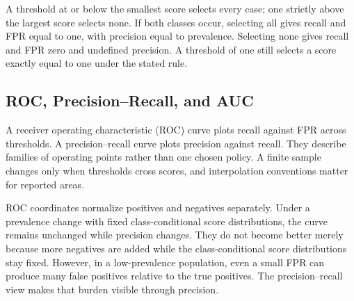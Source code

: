 \par\addvspace{\intextsep}\noindent\begin{minipage}{\linewidth}
\centering
{}
\label{fig:threshold-sweep}
\end{minipage}\par\addvspace{\intextsep}

A threshold at or below the smallest score selects every case; one strictly above the largest score selects none. If both classes occur, selecting all gives recall and FPR equal to one, with precision equal to prevalence. Selecting none gives recall and FPR zero and undefined precision. A threshold of one still selects a score exactly equal to one under the stated rule.

\subsection{ROC, Precision--Recall, and AUC}

A receiver operating characteristic (ROC) curve plots recall against FPR across thresholds. A precision--recall curve plots precision against recall. They describe families of operating points rather than one chosen policy. A finite sample changes only when thresholds cross scores, and interpolation conventions matter for reported areas.

ROC coordinates normalize positives and negatives separately. Under a prevalence change with fixed class-conditional score distributions, the curve remains unchanged while precision changes. They do not become better merely because more negatives are added while the class-conditional score distributions stay fixed. However, in a low-prevalence population, even a small FPR can produce many false positives relative to the true positives. The precision--recall view makes that burden visible through precision.

